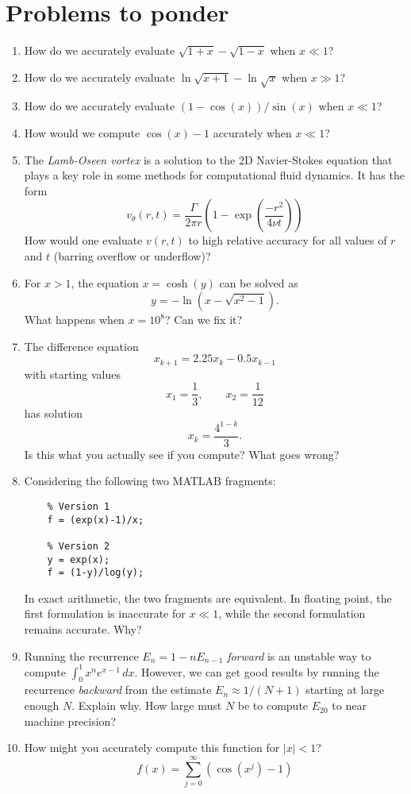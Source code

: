 \section{Problems to ponder}

\begin{enumerate}
\item
  How do we accurately evaluate $\sqrt{1+x}-\sqrt{1-x}$ when $x \ll 1$?
\item
  How do we accurately evaluate $\ln \sqrt{x+1}-\ln\sqrt{x}$ when $x \gg 1$?
\item
  How do we accurately evaluate $(1-\cos(x))/\sin(x)$ when $x \ll 1$?
\item
  How would we compute $\cos(x)-1$ accurately when $x \ll 1$?
\item
  The {\em Lamb-Oseen vortex} is a solution to the 2D Navier-Stokes
  equation that plays a key role in some methods for computational
  fluid dynamics.  It has the form
  \[
    v_{\theta}(r,t) = \frac{\Gamma}{2 \pi r}
      \left( 1 - \exp\left( \frac{-r^2}{4 \nu t} \right) \right)
  \]
  How would one evaluate $v(r,t)$ to high relative accuracy for all
  values of $r$ and $t$ (barring overflow or underflow)?
\item
  For $x > 1$, the equation $x = \cosh(y)$ can be solved as
  \[
    y = -\ln\left(x - \sqrt{x^2-1}\right).
  \]
  What happens when $x = 10^8$?  Can we fix it?
\item
  The difference equation
  \[
    x_{k+1} = 2.25x_k - 0.5 x_{k-1}
  \]
  with starting values
  \[
    x_1 = \frac{1}{3}, \qquad x_2 = \frac{1}{12}
  \]
  has solution
  \[
    x_k = \frac{4^{1-k}}{3}.
  \]
  Is this what you actually see if you compute?  What goes wrong?
\item
  Considering the following two MATLAB fragments:
\begin{lstlisting}
    % Version 1
    f = (exp(x)-1)/x;

    % Version 2
    y = exp(x);
    f = (1-y)/log(y);
\end{lstlisting}
  In exact arithmetic, the two fragments are equivalent.  In floating
  point, the first formulation is inaccurate for $x \ll 1$, while the
  second formulation remains accurate.  Why?
\item
  Running the recurrence $E_n = 1-nE_{n-1}$ {\em forward} is an
  unstable way to compute $\int_0^1 x^n e^{x-1} \, dx$.  However, we
  can get good results by running the recurrence {\em backward} from
  the estimate $E_n \approx 1/(N+1)$ starting at large enough $N$.
  Explain why.  How large must $N$ be to compute $E_{20}$ to near
  machine precision?
\item
  How might you accurately compute this function for $|x| < 1$?
  \[
    f(x) = \sum_{j=0}^\infty \left( \cos(x^j)-1 \right)
  \]
\end{enumerate}
